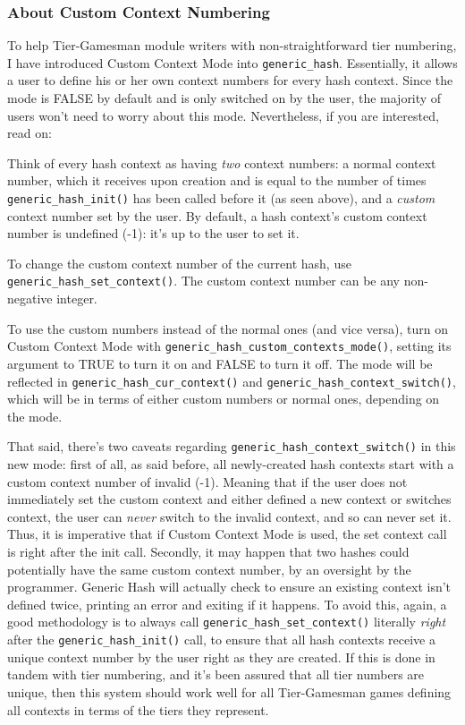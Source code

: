 \documentclass[11pt]{article}
\begin{document}
\subsubsection{About Custom Context Numbering}

To help Tier-Gamesman module writers with non-straightforward tier numbering, I have introduced Custom Context Mode into \texttt{generic\_hash}. Essentially, it allows a user to define his or her own context numbers for every hash context. Since the mode is FALSE by default and is only switched on by the user, the majority of users won't need to worry about this mode. Nevertheless, if you are interested, read on:

Think of every hash context as having \emph{two} context numbers: a normal context number, which it receives upon creation and is equal to the number of times \texttt{generic\_hash\_init()} has been called before it (as seen above), and a \emph{custom} context number set by the user. By default, a hash context's custom context number is undefined (-1): it's up to the user to set it.

To change the custom context number of the current hash, use \texttt{generic\_hash\_set\_context()}. The custom context number can be any non-negative integer.

To use the custom numbers instead of the normal ones (and vice versa), turn on Custom Context Mode with \texttt{generic\_hash\_custom\_contexts\_mode()}, setting its argument to TRUE to turn it on and FALSE to turn it off. The mode will be reflected in \texttt{generic\_hash\_cur\_context()} and \texttt{generic\_hash\_context\_switch()}, which will be in terms of either custom numbers or normal ones, depending on the mode.

That said, there's two caveats regarding \texttt{generic\_hash\_context\_switch()} in this new mode: first of all, as said before, all newly-created hash contexts start with a custom context number of invalid (-1). Meaning that if the user does not immediately set the custom context and either defined a new context or switches context, the user can \emph{never} switch to the invalid context, and so can never set it. Thus, it is imperative that if Custom Context Mode is used, the set context call is right after the init call. Secondly, it may happen that two hashes could potentially have the same custom context number, by an oversight by the programmer. Generic Hash will actually check to ensure an existing context isn't defined twice, printing an error and exiting if it happens. To avoid this, again, a good methodology is to always call \texttt{generic\_hash\_set\_context()} literally \emph{right} after the \texttt{generic\_hash\_init()} call, to ensure that all hash contexts receive a unique context number by the user right as they are created. If this is done in tandem with tier numbering, and it's been assured that all tier numbers are unique, then this system should work well for all Tier-Gamesman games defining all contexts in terms of the tiers they represent.
\end{document}
